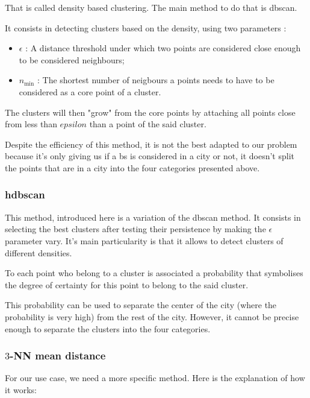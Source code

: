 \documentclass[lettersize,journal,english]{IEEEtran}
\begin{document}
That is called density based clustering. The main method to do that is \acrshort{dbscan}.

It consists in detecting clusters based on the density, using two parameters :

\begin{itemize}
    \item \emph{$\epsilon$} : A distance threshold under which two points are considered close enough to be considered neighbours;   
    \item \emph{$n_{\text{min}}$} : The shortest number of neigbours a points needs to have to be considered as a core point of a cluster.
    
\end{itemize}

The clusters will then "grow" from the core points by attaching all points close from less than \emph{$epsilon$} than a point of the said 
cluster.

Despite the efficiency of this method, it is not the best adapted to our problem because it's only giving us if a \acrshort{bs} is considered 
in a city or not, it doesn't split the points that are in a city into the four categories presented above.

\subsubsection{\acrshort{hdbscan}}
This method, introduced here \cite{10.1007/978-3-642-37456-2_14} is a variation of the \acrshort{dbscan} method. It consists
in selecting the best clusters after testing their persistence by making the $\epsilon$ parameter vary. It's main particularity
is that it allows to detect clusters of different densities.

To each point who belong to a cluster is associated a probability that symbolises the degree of certainty for this point to belong
to the said cluster.

This probability can be used to separate the center of the city (where the probability is very high) from the rest of the city. However,
it cannot be precise enough to separate the clusters into the four categories.

\subsubsection{$3$-NN mean distance}
For our use case, we need a more specific method. Here is the explanation of how it works:
\end{document}
